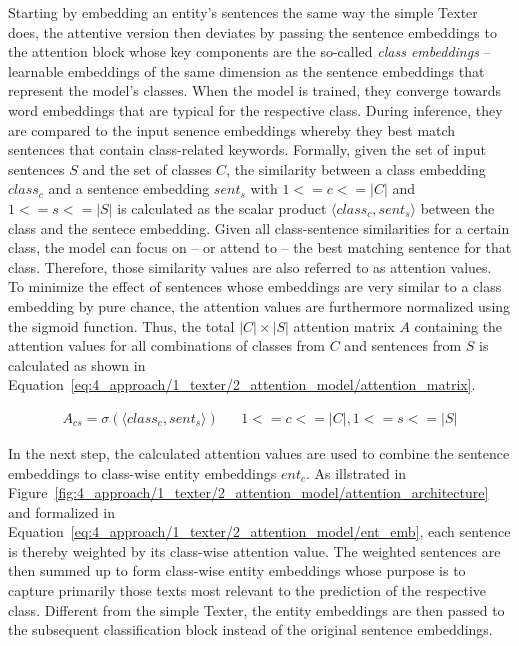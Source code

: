 Starting by embedding an entity's sentences the same way the simple Texter does, the attentive version then deviates by passing the sentence embeddings to the attention block whose key components are the so-called \emph{class embeddings} -- learnable embeddings of the same dimension as the sentence embeddings that represent the model's classes. When the model is trained, they converge towards word embeddings that are typical for the respective class. During inference, they are compared to the input senence embeddings whereby they best match sentences that contain class-related keywords. Formally, given the set of input sentences $S$ and the set of classes $C$, the similarity between a class embedding $class_c$ and a sentence embedding $sent_s$ with $1 <= c <= |C|$ and $1 <= s <= |S|$ is calculated as the scalar product $\langle class_c, sent_s \rangle$ between the class and the sentece embedding. Given all class-sentence similarities for a certain class, the model can focus on -- or attend to -- the best matching sentence for that class. Therefore, those similarity values are also referred to as attention values. To minimize the effect of sentences whose embeddings are very similar to a class embedding by pure chance, the attention values are furthermore normalized using the sigmoid function. Thus, the total $|C| \times |S|$ attention matrix $A$ containing the attention values for all combinations of classes from $C$ and sentences from $S$ is calculated as shown in Equation~\ref{eq:4_approach/1_texter/2_attention_model/attention_matrix}.

\begin{align}
    A_{cs} = \sigma(\langle class_c , sent_s \rangle) && 1 <= c <= |C|, 1 <= s <= |S|
    \label{eq:4_approach/1_texter/2_attention_model/attention_matrix}
\end{align}

In the next step, the calculated attention values are used to combine the sentence embeddings to class-wise entity embeddings $ent_c$. As illstrated in Figure~\ref{fig:4_approach/1_texter/2_attention_model/attention_architecture} and formalized in Equation~\ref{eq:4_approach/1_texter/2_attention_model/ent_emb}, each sentence is thereby weighted by its class-wise attention value. The weighted sentences are then summed up to form class-wise entity embeddings whose purpose is to capture primarily those texts most relevant to the prediction of the respective class. Different from the simple Texter, the entity embeddings are then passed to the subsequent classification block instead of the original sentence embeddings.

